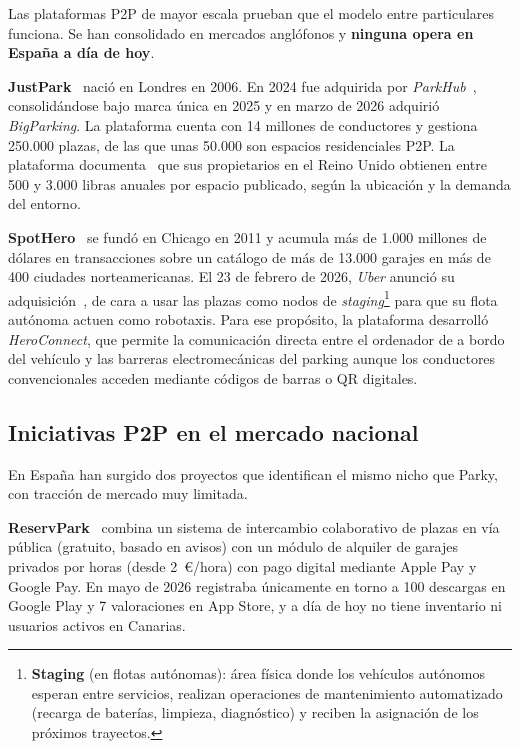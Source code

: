 Las plataformas P2P de mayor escala prueban que el modelo entre particulares funciona. Se han consolidado en mercados anglófonos y \textbf{ninguna opera en España a día de hoy}.

\textbf{JustPark}~\cite{justpark2026}  nació en Londres en 2006. En 2024 fue adquirida por \textit{ParkHub}~\cite{justpark2026parkhub}, consolidándose bajo marca única en 2025 y en marzo de 2026 adquirió \textit{BigParking}. La plataforma cuenta con 14 millones de conductores y gestiona 250.000 plazas, de las que unas 50.000 son espacios residenciales P2P. La plataforma documenta~\cite{justpark2026earnings} que sus propietarios en el Reino Unido obtienen entre 500 y 3.000 libras anuales por espacio publicado, según la ubicación y la demanda del entorno.

\textbf{SpotHero}~\cite{spothero2026} se fundó en Chicago en 2011 y acumula más de 1.000 millones de dólares en transacciones sobre un catálogo de más de 13.000 garajes
en más de 400 ciudades norteamericanas. El 23 de febrero de 2026, \textit{Uber} anunció su adquisición~\cite{uber2026spothero}, de cara a usar las plazas como nodos de \textit{staging}\footnote{\textbf{Staging} (en flotas autónomas): área física donde los vehículos autónomos esperan entre servicios, realizan operaciones de mantenimiento automatizado (recarga de baterías, limpieza, diagnóstico) y reciben la asignación de los próximos trayectos.} para que su flota autónoma actuen como robotaxis. Para ese propósito, la plataforma desarrolló \textit{HeroConnect}, que permite la comunicación directa entre el ordenador de a bordo del vehículo y las barreras electromecánicas del parking aunque los conductores convencionales acceden mediante códigos de barras o QR digitales.

\subsection{Iniciativas P2P en el mercado nacional}
\label{sec:p2p-nacional}

En España han surgido dos proyectos que identifican el mismo nicho que Parky, con tracción de mercado muy limitada.

\textbf{ReservPark}~\cite{reservpark2026} combina un sistema de intercambio colaborativo de plazas en vía pública (gratuito, basado en avisos) con un módulo de alquiler de garajes privados por horas (desde 2~€/hora) con pago digital mediante Apple Pay y Google Pay. En mayo de 2026 registraba únicamente en torno a 100 descargas en Google Play y 7 valoraciones en App Store, y a día de hoy no tiene inventario ni usuarios activos en Canarias.

